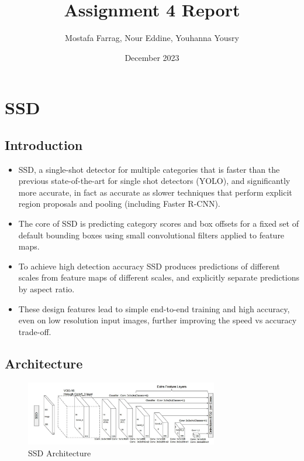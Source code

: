 \documentclass[12pt]{article}
\title{Assignment 4 Report}
\author{Mostafa Farrag, Nour Eddine, Youhanna Yousry}
\date{December 2023}
\begin{document}
\maketitle
\newpage
\tableofcontents
\newpage

\section{SSD}
\subsection{Introduction}

\begin{itemize}
    \item SSD, a single-shot detector for multiple categories that is faster than
the previous state-of-the-art for single shot detectors (YOLO), and significantly
more accurate, in fact as accurate as slower techniques that perform explicit region
proposals and pooling (including Faster R-CNN).
    \item The core of SSD is predicting category scores and box offsets for a fixed set of
default bounding boxes using small convolutional filters applied to feature maps.
    \item To achieve high detection accuracy SSD produces predictions of different scales from
feature maps of different scales, and explicitly separate predictions by aspect ratio.
    \item These design features lead to simple end-to-end training and high accuracy, even
on low resolution input images, further improving the speed vs accuracy trade-off.
\end{itemize}

\subsection{Architecture}
\begin{figure}[h]
    \centering
    \includegraphics[width=0.75\textwidth]{images/ssd_arch.png}
    \caption{SSD Architecture}
    \label{fig:ssd1}
\end{figure}
\end{document}
